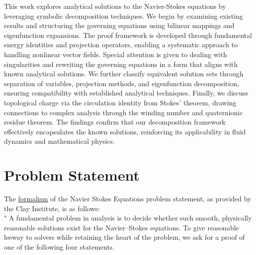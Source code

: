 \documentclass[12pt]{article}
\begin{document}
\abstract 
This work explores analytical solutions to the Navier-Stokes equations by leveraging symbolic decomposition techniques. We begin by examining existing results and structuring the governing equations using bilinear mappings and eigenfunction expansions. The proof framework is developed through fundamental energy identities and projection operators, enabling a systematic approach to handling nonlinear vector fields. Special attention is given to dealing with singularities and rewriting the governing equations in a form that aligns with known analytical solutions. We further classify equivalent solution sets through separation of variables, projection methods, and eigenfunction decomposition, ensuring compatibility with established analytical techniques. Finally, we discuss topological charge via the circulation identity from Stokes' theorem, drawing connections to complex analysis through the winding number and quaternionic residue theorem. The findings confirm that our decomposition framework effectively encapsulates the known solutions, reinforcing its applicability in fluid dynamics and mathematical physics.

\tableofcontents \newpage

\section{Problem Statement}
The \href{https://www.claymath.org/wp-content/uploads/2022/06/navierstokes.pdf}{formalism} of the Navier Stokes Equations problem statement, as provided by the Clay Institute, is as follows: \\ 

" A fundamental problem in analysis is to decide whether such smooth, physically
reasonable solutions exist for the Navier–Stokes equations. To give reasonable leeway to solvers while retaining the heart of the problem, we ask for a proof of one of the following four statements. \\
\end{document}
